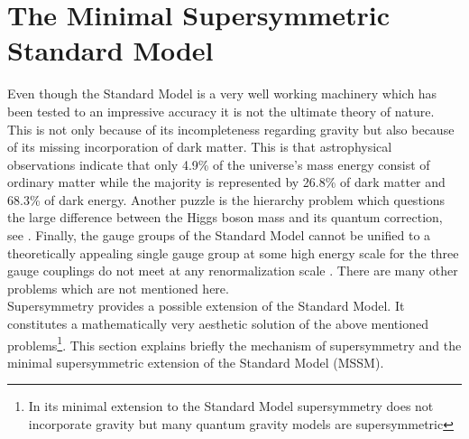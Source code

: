 
\section{The Minimal Supersymmetric Standard Model}
Even though the Standard Model is a very well working machinery which has been tested to an impressive accuracy it is not the ultimate theory of nature. This is not only because of its incompleteness regarding gravity but also because of its missing incorporation of dark matter. This is that astrophysical observations \cite{Adam:2015rua} indicate that only 4.9\% of the universe's mass energy consist of ordinary matter while the majority is represented by 26.8\% of dark matter and 68.3\% of dark energy. Another puzzle is the hierarchy problem which questions the large difference between the Higgs boson mass and its quantum correction, see \cite{Martin:1997ns}. Finally, the gauge groups of the Standard Model cannot be unified to a theoretically appealing single gauge group at some high energy scale for the three gauge couplings do not meet at any renormalization scale \cite{Martin:1997ns}. There are many other problems which are not mentioned here\cite{Bach}.\\
Supersymmetry provides a possible extension of the Standard Model. It constitutes a mathematically very aesthetic solution of the above mentioned problems\footnote{In its minimal extension to the Standard Model supersymmetry does not incorporate gravity but many quantum gravity models are supersymmetric}. This section explains briefly the mechanism of supersymmetry and the minimal supersymmetric extension of the Standard Model (MSSM).

